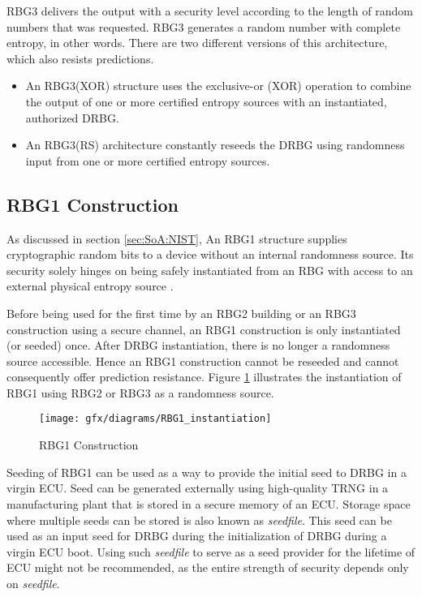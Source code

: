 RBG3 delivers the output with a security level according to the length of random numbers that was requested. RBG3 generates a random number with complete entropy, in other words. There are two different versions of this architecture, which also resists predictions.

\begin{itemize}
	\item An RBG3(XOR) structure uses the exclusive-or (XOR) operation to combine the output of one or more certified entropy sources with an instantiated, authorized DRBG.
	
	\item An RBG3(RS) architecture constantly reseeds the DRBG using randomness input from one or more certified entropy sources.
\end{itemize}

%
%
\subsection{RBG1 Construction}
\label{subsec:SoA:RBG1}
As discussed in section \ref{sec:SoA:NIST}, An RBG1 structure supplies cryptographic random bits to a device without an internal randomness source. Its security solely hinges on being safely instantiated from an RBG with access to an external physical entropy source \cite{SP90C-2022}. 

Before being used for the first time by an RBG2 building or an RBG3 construction using a secure channel, an RBG1 construction is only instantiated (or seeded) once. After DRBG instantiation, there is no longer a randomness source accessible. Hence an RBG1 construction cannot be reseeded and cannot consequently offer prediction resistance. Figure \ref{fig:3:1} illustrates the instantiation of RBG1 using RBG2 or RBG3 as a randomness source.

\begin{figure}[htbp]
	\centering
	\texttt{[image: gfx/diagrams/RBG1\_instantiation]}
	\caption{RBG1 Construction \cite{SP90C-2022}}
	\label{fig:3:1}
\end{figure}

Seeding of RBG1 can be used as a way to provide the initial seed to DRBG in a virgin ECU. Seed can be generated externally using high-quality TRNG in a manufacturing plant that is stored in a secure memory of an ECU. Storage space where multiple seeds can be stored is also known as \textit{seedfile}. This seed can be used as an input seed for DRBG during the initialization of DRBG during a virgin ECU boot. Using such \textit{seedfile} to serve as a seed provider for the lifetime of ECU might not be recommended, as the entire strength of security depends only on \textit{seedfile}.

